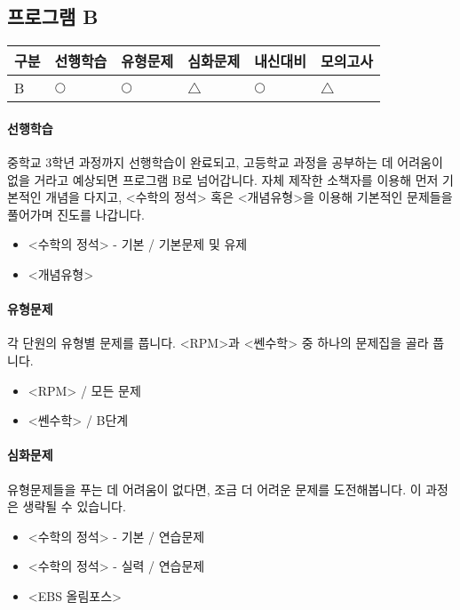 \documentclass{oblivoir}
\begin{document}
\newpage
%
\subsection{프로그램 B}
\vspace{-10pt}
\begin{center}
\centering
\begin{tabu}[t]{|X[c]|X[c]X[c]X[c]X[c]X[c]|}
\hline
구분	&선행학습	&유형문제	&심화문제	&내신대비	&모의고사\\\hline
B	&\(\bigcirc\)	&\(\bigcirc\)	&\(\triangle\)	&\(\bigcirc\)	&\(\triangle\)\\\hline
\end{tabu}
\end{center}
\paragraph{선행학습}
중학교 3학년 과정까지 선행학습이 완료되고, 고등학교 과정을 공부하는 데 어려움이 없을 거라고 예상되면 프로그램 B로 넘어갑니다.
자체 제작한 소책자를 이용해 먼저 기본적인 개념을 다지고, <수학의 정석> 혹은 <개념유형>을 이용해 기본적인 문제들을 풀어가며 진도를 나갑니다.
\begin{itemize}\tightlist
\item
<수학의 정석> - 기본 / 기본문제 및 유제
\item
<개념유형>
\end{itemize}
\paragraph{유형문제}
각 단원의 유형별 문제를 풉니다.
<RPM>과 <쎈수학> 중 하나의 문제집을 골라 풉니다.
\begin{itemize}\tightlist
\item
<RPM> / 모든 문제
\item
<쎈수학> / B단계
\end{itemize}
\paragraph{심화문제}
유형문제들을 푸는 데 어려움이 없다면, 조금 더 어려운 문제를 도전해봅니다.
이 과정은 생략될 수 있습니다.
\begin{itemize}\tightlist
\item
<수학의 정석> - 기본 / 연습문제
\item
<수학의 정석> - 실력 / 연습문제
\item
<EBS 올림포스>
\end{itemize}
\end{document}
